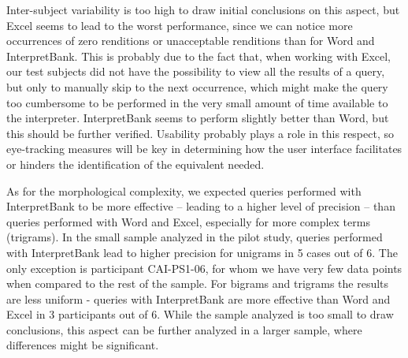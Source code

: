 \documentclass[output=paper]{langsci/langscibook}
\begin{document}
Inter-subject variability is too high to draw initial conclusions on this aspect, but Excel seems to lead to the worst performance, since we can notice more occurrences of zero renditions or unacceptable renditions than for Word and InterpretBank. This is probably due to the fact that, when working with Excel, our test subjects did not have the possibility to view all the results of a query, but only to manually skip to the next occurrence, which might make the query too cumbersome to be performed in the very small amount of time available to the interpreter. InterpretBank seems to perform slightly better than Word, but this should be further verified. Usability probably plays a role in this respect, so eye-tracking measures will be key in determining how the user interface facilitates or hinders the identification of the equivalent needed.

As for the morphological complexity, we expected queries performed with InterpretBank to be more effective – leading to a higher level of precision – than queries performed with Word and Excel, especially for more complex terms (trigrams). In the small sample analyzed in the pilot study, queries performed with InterpretBank lead to higher precision for unigrams in 5 cases out of 6. The only exception is participant CAI-PS1-06, for whom we have very few data points when compared to the rest of the sample. For bigrams and trigrams the results are less uniform - queries with InterpretBank are more effective than Word and Excel in 3 participants out of 6. While the sample analyzed is too small to draw conclusions, this aspect can be further analyzed in a larger sample, where differences might be significant.
\end{document}
